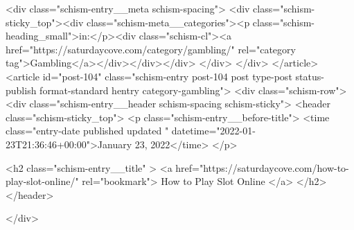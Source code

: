 {		<div class="schism-entry__meta schism-spacing">			<div class="schism-sticky_top"><div class="schism-meta__categories"><p class="schism-heading_small">in:</p><div class="schism-cl"><a href="https://saturdaycove.com/category/gambling/" rel="category tag">Gambling</a></div></div></div>		</div>
	</div>
</article>
<article id="post-104" class="schism-entry post-104 post type-post status-publish format-standard hentry category-gambling">
	<div class="schism-row">		<div class="schism-entry__header schism-spacing schism-sticky">			<header class="schism-sticky_top">				<p class="schism-entry__before-title">
					<time class="entry-date published updated " datetime="2022-01-23T21:36:46+00:00">January 23, 2022</time>				</p>

				<h2 class="schism-entry__title" >
					<a href="https://saturdaycove.com/how-to-play-slot-online/" rel="bookmark">
						How to Play Slot Online					</a>
				</h2>
			</header>

					</div>

}
